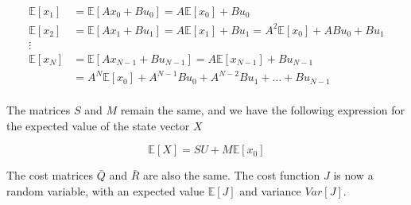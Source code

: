 \documentclass{article}
\begin{document}
\begin{equation}
  \begin{aligned}
    \mathbb{E}[x_1] &= \mathbb{E}[A x_0 + B u_0] = A \mathbb{E}[x_0] + B u_0 \\
    \mathbb{E}[x_2] &= \mathbb{E}[A x_1 + B u_1] = A \mathbb{E}[x_1] + B u_1 = A^2 \mathbb{E}[x_0] + A B u_0 + B u_1 \\
    \vdots \\
    \mathbb{E}[x_N] &= \mathbb{E}[A x_{N-1} + B u_{N-1}] = A \mathbb{E}[x_{N-1}] + B u_{N-1} \\
    &= A^N \mathbb{E}[x_0] + A^{N-1} B u_0 + A^{N-2} B u_1 + \ldots + B u_{N-1} \\
  \end{aligned}
\end{equation}

The matrices $S$ and $M$ remain the same, and we have the following expression for the expected value of the state vector $X$

$$
\mathbb{E}[X] = S U + M \mathbb{E}[x_0]
$$

The cost matrices $\bar{Q}$ and $\bar{R}$ are also the same. The cost function $J$ is now a random variable,
with an expected value $\mathbb{E}[J]$ and variance $Var[J]$.
\end{document}

